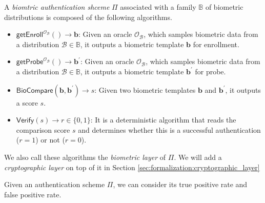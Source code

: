 \begin{definition}

A \emph{biomtric authentication shceme} $\Pi$ associated with a family $\mathbb{B}$ of biometric distributions is composed of the following algorithms.

\begin{itemize}

	\item $\textsf{getEnroll}^{\mathcal{O}_{\mathcal{B}}}() \to \mathbf{b}$: Given an oracle $\mathcal{O}_{\mathcal{B}}$, which samples biometric data from a distribution $\mathcal{B} \in \mathbb{B}$, it outputs a biometric template $\mathbf{b}$ for enrollment.

	\item $\textsf{getProbe}^{\mathcal{O}_{\mathcal{B}}}() \to \mathbf{b}^\prime$: Given an oracle $\mathcal{O}_{\mathcal{B}}$, which samples biometric data from a distribution $\mathcal{B} \in \mathbb{B}$, it outputs a biometric template $\mathbf{b}^\prime$ for probe.

	\item $\textsf{BioCompare}(\mathbf{b}, \mathbf{b}^\prime) \to s$: Given two biometric templates $\mathbf{b}$ and $\mathbf{b}^\prime$, it outputs a score $s$. 

	\item $\textsf{Verify}(s) \to r \in \{0,1\}$: It is a deterministic algorithm that reads the comparison score $s$ and determines whether this is a successful authentication ($r = 1$) or not ($r = 0$).

\end{itemize}
We also call these algorithms the \emph{biometric layer} of $\Pi$. We will add a \emph{cryptographic layer} on top of it in Section \ref{sec:formalization:cryptographic_layer}

\end{definition}


Given an authentication scheme $\Pi$, we can consider its true positive rate and false positive rate.

